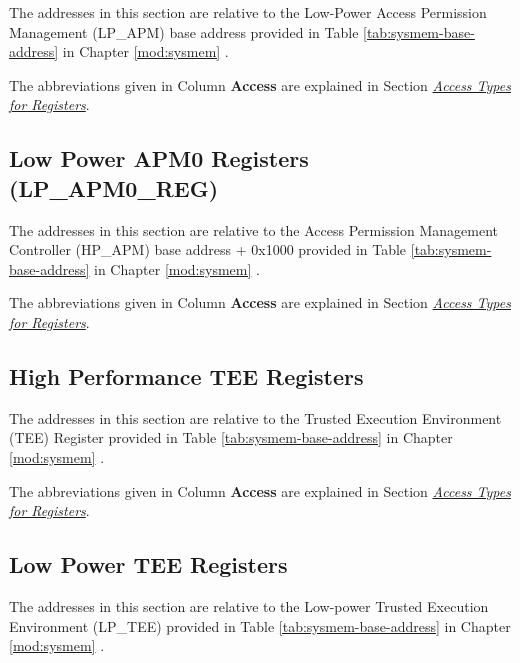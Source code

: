\documentclass[main\_\_EN.tex]{subfiles}
\begin{document}
The addresses in this section are relative to the Low-Power Access Permission Management (LP\_APM) base address provided in Table \ref{tab:sysmem-base-address} in Chapter \ref{mod:sysmem} \textit{}.

The abbreviations given in Column \textbf{Access} are explained in Section \hyperref[glossary-access-types]{\textit{Access Types for Registers}}.



\subsection{Low Power APM0 Registers (LP\_APM0\_REG)}
\label{sec:permctrl-reg-lp0}

The addresses in this section are relative to the Access Permission Management Controller (HP\_APM) base address + 0x1000 provided in Table \ref{tab:sysmem-base-address} in Chapter \ref{mod:sysmem} \textit{}.

The abbreviations given in Column \textbf{Access} are explained in Section \hyperref[glossary-access-types]{\textit{Access Types for Registers}}.



\subsection{High Performance TEE Registers}

The addresses in this section are relative to the Trusted Execution Environment (TEE) Register provided in Table \ref{tab:sysmem-base-address} in Chapter \ref{mod:sysmem} \textit{}.

The abbreviations given in Column \textbf{Access} are explained in Section \hyperref[glossary-access-types]{\textit{Access Types for Registers}}.



\subsection{Low Power TEE Registers}

The addresses in this section are relative to the Low-power Trusted Execution Environment (LP\_TEE) provided in Table \ref{tab:sysmem-base-address} in Chapter \ref{mod:sysmem} \textit{}.
\end{document}
